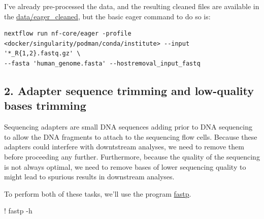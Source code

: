 \documentclass[
  letterpaper,
]{book}
\newenvironment{Shaded}{}{}
\newcommand{\NormalTok}[1]{\textcolor[rgb]{0.14,0.16,0.18}{#1}}
\newcommand{\OperatorTok}[1]{\textcolor[rgb]{0.14,0.16,0.18}{#1}}
\begin{document}
I've already pre-processed the data, and the resulting cleaned files are
available in the \url{data/eager_cleaned}, but the basic eager command
to do so is:

\begin{verbatim}
nextflow run nf-core/eager -profile <docker/singularity/podman/conda/institute> --input '*_R{1,2}.fastq.gz' \
--fasta 'human_genome.fasta' --hostremoval_input_fastq
\end{verbatim}

\hypertarget{adapter-sequence-trimming-and-low-quality-bases-trimming}{%
\subsection{2. Adapter sequence trimming and low-quality bases
trimming}\label{adapter-sequence-trimming-and-low-quality-bases-trimming}}

Sequencing adapters are small DNA sequences adding prior to DNA
sequencing to allow the DNA fragments to attach to the sequencing flow
cells. Because these adapters could interfere with downtstream analyses,
we need to remove them before proceeding any further. Furthermore,
because the quality of the sequencing is not always optimal, we need to
remove bases of lower sequencing quality to might lead to spurious
results in downstream analyses.

To perform both of these tasks, we'll use the program
\href{https://github.com/OpenGene/fastp}{fastp}.

\begin{Shaded}
\begin{Highlighting}[]
\OperatorTok{!}\NormalTok{ fastp }\OperatorTok{{-}}\NormalTok{h}
\end{Highlighting}
\end{Shaded}
\end{document}
